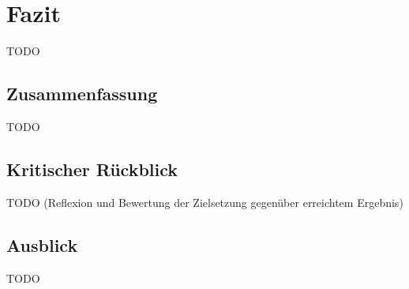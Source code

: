 \chapter{Fazit}
TODO

\section{Zusammenfassung}
TODO

\section{Kritischer Rückblick}
TODO (Reflexion und Bewertung der Zielsetzung gegenüber erreichtem Ergebnis)

\section{Ausblick}
TODO